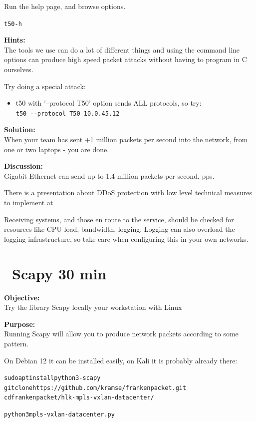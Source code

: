 \documentclass[a4paper,11pt,notitlepage]{report}
\begin{document}
Run the help page, and browse options.
\begin{alltt}\footnotesize
t50 -h
\end{alltt}





{\bf Hints:}\\
The tools we use can do a lot of different things and using the command line options can produce high speed packet attacks without having to program in C ourselves.

Try doing a special attack:
\begin{itemize}
\item t50 with '--protocol T50' option sends ALL protocols, so try:\\
\verb+t50 --protocol T50 10.0.45.12+
\end{itemize}


{\bf Solution:}\\
When your team has sent +1 million packets per second into the network, from one or two laptops - you are done.

{\bf Discussion:}\\
Gigabit Ethernet can send up to 1.4 million packets per second, pps.

There is a presentation about DDoS protection with low level technical measures to implement at\\
{\footnotesize {}}

Receiving systems, and those en route to the service, should be checked for resources like CPU load, bandwidth, logging. Logging can also overload the logging infrastructure, so take care when configuring this in your own networks.




\chapter{\faInfoCircle\ Scapy 30 min}
\label{ex:scapy}

{\bf Objective:}\\
Try the library Scapy locally your workstation with Linux


{\bf Purpose:}\\
Running Scapy will allow you to produce network packets according to some pattern.

On Debian 12 it can be installed easily, on Kali it is probably already there:
\begin{alltt}\footnotesize
sudo apt install python3-scapy
git clone https://github.com/kramse/frankenpacket.git
cd frankenpacket/hlk-mpls-vxlan-datacenter/

python3 mpls-vxlan-datacenter.py
\end{alltt}
\end{document}

